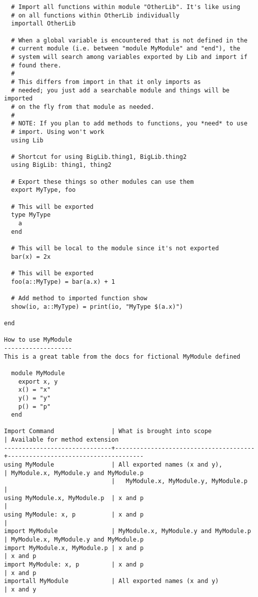\documentclass[12pt]{article}
\theoremstyle{plain}
\theoremstyle{definition}
\theoremstyle{remark}
\begin{document}
\begin{lstlisting}
  # Import all functions within module "OtherLib". It's like using
  # on all functions within OtherLib individually
  importall OtherLib

  # When a global variable is encountered that is not defined in the
  # current module (i.e. between "module MyModule" and "end"), the
  # system will search among variables exported by Lib and import if
  # found there.
  #
  # This differs from import in that it only imports as
  # needed; you just add a searchable module and things will be imported
  # on the fly from that module as needed.
  #
  # NOTE: If you plan to add methods to functions, you *need* to use
  # import. Using won't work
  using Lib

  # Shortcut for using BigLib.thing1, BigLib.thing2
  using BigLib: thing1, thing2

  # Export these things so other modules can use them
  export MyType, foo

  # This will be exported
  type MyType
    a
  end

  # This will be local to the module since it's not exported
  bar(x) = 2x

  # This will be exported
  foo(a::MyType) = bar(a.x) + 1

  # Add method to imported function show
  show(io, a::MyType) = print(io, "MyType $(a.x)")

end

How to use MyModule
-------------------
This is a great table from the docs for fictional MyModule defined

  module MyModule
    export x, y
    x() = "x"
    y() = "y"
    p() = "p"
  end

Import Command                | What is brought into scope            | Available for method extension
------------------------------+---------------------------------------+--------------------------------------
using MyModule                | All exported names (x and y),         | MyModule.x, MyModule.y and MyModule.p
                              |   MyModule.x, MyModule.y, MyModule.p  |
using MyModule.x, MyModule.p  | x and p                               |
using MyModule: x, p          | x and p                               |
import MyModule               | MyModule.x, MyModule.y and MyModule.p | MyModule.x, MyModule.y and MyModule.p
import MyModule.x, MyModule.p | x and p                               | x and p
import MyModule: x, p         | x and p                               | x and p
importall MyModule            | All exported names (x and y)          | x and y



\end{lstlisting}
\end{document}
